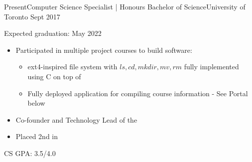 %
%
%


\begin{experiences}
  \university
    {Present}{Computer Science Specialist | Honours Bachelor of Science}{University of Toronto}
    {Sept 2017} {
                      Expected graduation: May 2022
                      \begin{itemize}
                        \item Participated in multiple project courses to build software:
                          \begin{itemize}
                            \item{ext4-inspired file system with $ls,cd,mkdir,mv,rm$ fully implemented using C on top of }
                            \item{Fully deployed application for compiling course information - See Portal below}
                          \end{itemize}         
                        \item Co-founder and Technology Lead of the            
                        \item Placed 2nd in                                                                 
                      \end{itemize}
                    }
                    {CS GPA: 3.5/4.0}
\end{experiences}

